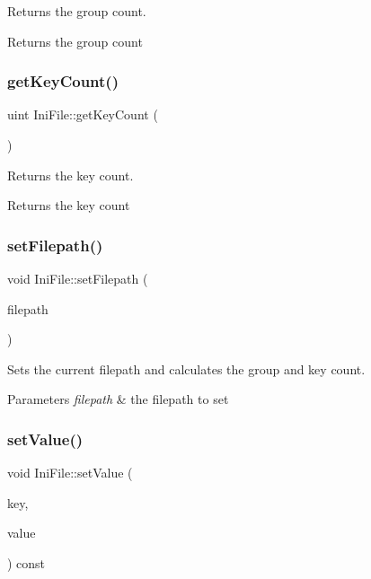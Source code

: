 Returns the group count. 

\begin{DoxyReturn}{Returns}
the group count 
\end{DoxyReturn}
\mbox{\label{class_ini_file_ad7a83aa937129895253cf853726826d6}} 
\subsubsection{\texorpdfstring{getKeyCount()}{getKeyCount()}}
{\footnotesize\ttfamily uint Ini\+File\+::get\+Key\+Count (\begin{DoxyParamCaption}{ }\end{DoxyParamCaption})}



Returns the key count. 

\begin{DoxyReturn}{Returns}
the key count 
\end{DoxyReturn}
\mbox{\label{class_ini_file_a3b3caa195a0be5077e8575e259ef7e53}} 
\subsubsection{\texorpdfstring{setFilepath()}{setFilepath()}}
{\footnotesize\ttfamily void Ini\+File\+::set\+Filepath (\begin{DoxyParamCaption}\item[{const \mbox{\hyperlink{class_a_string}{A\+String}} \&}]{filepath }\end{DoxyParamCaption})}



Sets the current filepath and calculates the group and key count. 


\begin{DoxyParams}{Parameters}
{\em filepath} & the filepath to set \\
\hline
\end{DoxyParams}
\mbox{\label{class_ini_file_a5d6fe5d2b2364c88376d49115007007f}} 
\subsubsection{\texorpdfstring{setValue()}{setValue()}}
{\footnotesize\ttfamily void Ini\+File\+::set\+Value (\begin{DoxyParamCaption}\item[{const \mbox{\hyperlink{class_a_string}{A\+String}} \&}]{key,  }\item[{const \mbox{\hyperlink{class_a_string}{A\+String}} \&}]{value }\end{DoxyParamCaption}) const}



